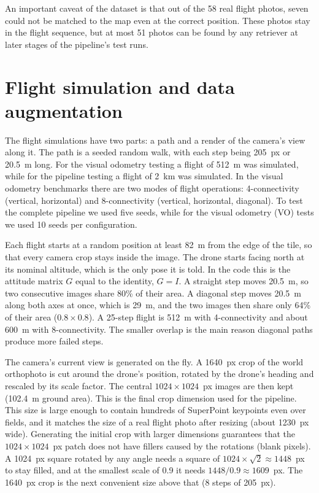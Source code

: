 \documentclass[english, Lau, oneside]{sapthesis}%
\begin{document}
An important caveat of the dataset is that out of the 58 real flight photos, seven could not be matched to the map even at the correct position. These photos stay in the flight sequence, but at most 51 photos can be found by any retriever at later stages of the pipeline's test runs.

\section{Flight simulation and data augmentation}
\label{sec:simulation}
The flight simulations have two parts: a path and a render of the camera's view along it. The path is a seeded random walk, with each step being 205~px or 20.5~m long. For the visual odometry testing a flight of 512~m was simulated, while for the pipeline testing a flight of 2~km was simulated. In the visual odometry benchmarks there are two modes of flight operations: 4-connectivity (vertical, horizontal) and 8-connectivity (vertical, horizontal, diagonal). To test the complete pipeline we used five seeds, while for the visual odometry (VO) tests we used 10 seeds per configuration.

Each flight starts at a random position at least 82~m from the edge of the tile, so that every camera crop stays inside the image. The drone starts facing north at its nominal altitude, which is the only pose it is told. In the code this is the attitude matrix $G$ equal to the identity, $G = I$. A straight step moves 20.5~m, so two consecutive images share 80\% of their area. A diagonal step moves 20.5~m along both axes at once, which is 29~m, and the two images then share only 64\% of their area ($0.8 \times 0.8$). A 25-step flight is 512~m with 4-connectivity and about 600~m with 8-connectivity. The smaller overlap is the main reason diagonal paths produce more failed steps.

The camera's current view is generated on the fly. A 1640~px crop of the world orthophoto is cut around the drone's position, rotated by the drone's heading and rescaled by its scale factor. The central $1024 \times 1024$~px images are then kept (102.4~m ground area). This is the final crop dimension used for the pipeline. This size is large enough to contain hundreds of SuperPoint \citep{detone2018superpoint} keypoints even over fields, and it matches the size of a real flight photo after resizing (about 1230~px wide). Generating the initial crop with larger dimensions guarantees that the $1024 \times 1024$~px patch does not have fillers caused by the rotations (blank pixels). A 1024~px square rotated by any angle needs a square of $1024 \times \sqrt{2} \approx 1448$~px to stay filled, and at the smallest scale of 0.9 it needs $1448 / 0.9 \approx 1609$~px. The 1640~px crop is the next convenient size above that (8 steps of 205~px).
\end{document}
